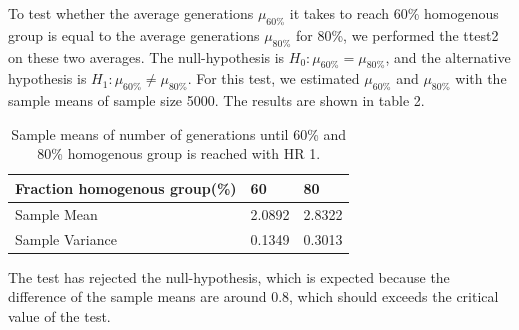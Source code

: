To test whether the average generations $\mu_{60\%}$ it takes to reach 60\% homogenous group is equal to the average generations $\mu_{80\%}$ for 80\%, we performed the ttest2 on these two averages. The null-hypothesis is $H_0:\mu_{60\%}=\mu_{80\%}$, and the alternative hypothesis is $H_1: \mu_{60\%}\neq \mu_{80\%}$. For this test, we estimated $\mu_{60\%}$ and $\mu_{80\%}$ with the sample means of sample size 5000. The results are shown in table 2.
\begin{table}[htp]
\centering
\caption{Sample means of number of generations until 60\% and 80\% homogenous group is reached with HR 1.}
\begin{tabular}{|l|l|l|}
\hline
 Fraction homogenous group(\%)&60&80 \\ \hline
 Sample Mean&2.0892&2.8322  \\
 Sample Variance & 0.1349 & 0.3013\\ \hline 
\end{tabular}
\end{table}
The test has rejected the null-hypothesis, which is expected because the difference of the sample means are around 0.8, which should exceeds the critical value of the test.

